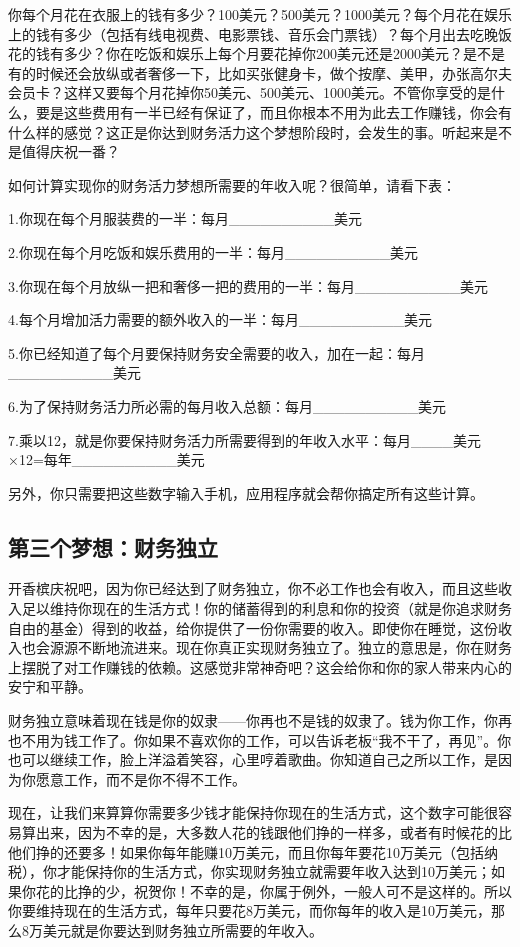 你每个月花在衣服上的钱有多少？100美元？500美元？1000美元？每个月花在娱乐上的钱有多少（包括有线电视费、电影票钱、音乐会门票钱）？每个月出去吃晚饭花的钱有多少？你在吃饭和娱乐上每个月要花掉你200美元还是2000美元？是不是有的时候还会放纵或者奢侈一下，比如买张健身卡，做个按摩、美甲，办张高尔夫会员卡？这样又要每个月花掉你50美元、500美元、1000美元。不管你享受的是什么，要是这些费用有一半已经有保证了，而且你根本不用为此去工作赚钱，你会有什么样的感觉？这正是你达到财务活力这个梦想阶段时，会发生的事。听起来是不是值得庆祝一番？

如何计算实现你的财务活力梦想所需要的年收入呢？很简单，请看下表：

1.你现在每个月服装费的一半：每月\_\_\_\_\_\_\_\_\_\_美元

2.你现在每个月吃饭和娱乐费用的一半：每月\_\_\_\_\_\_\_\_\_\_美元

3.你现在每个月放纵一把和奢侈一把的费用的一半：每月\_\_\_\_\_\_\_\_\_\_美元

4.每个月增加活力需要的额外收入的一半：每月\_\_\_\_\_\_\_\_\_\_美元

5.你已经知道了每个月要保持财务安全需要的收入，加在一起：每月\_\_\_\_\_\_\_\_\_\_美元

6.为了保持财务活力所必需的每月收入总额：每月\_\_\_\_\_\_\_\_\_\_美元

7.乘以12，就是你要保持财务活力所需要得到的年收入水平：每月\_\_\_\_美元×12=每年\_\_\_\_\_\_\_\_\_\_美元

另外，你只需要把这些数字输入手机，应用程序就会帮你搞定所有这些计算。

\subsection{第三个梦想：财务独立}

开香槟庆祝吧，因为你已经达到了财务独立，你不必工作也会有收入，而且这些收入足以维持你现在的生活方式！你的储蓄得到的利息和你的投资（就是你追求财务自由的基金）得到的收益，给你提供了一份你需要的收入。即使你在睡觉，这份收入也会源源不断地流进来。现在你真正实现财务独立了。独立的意思是，你在财务上摆脱了对工作赚钱的依赖。这感觉非常神奇吧？这会给你和你的家人带来内心的安宁和平静。

财务独立意味着现在钱是你的奴隶——你再也不是钱的奴隶了。钱为你工作，你再也不用为钱工作了。你如果不喜欢你的工作，可以告诉老板“我不干了，再见”。你也可以继续工作，脸上洋溢着笑容，心里哼着歌曲。你知道自己之所以工作，是因为你愿意工作，而不是你不得不工作。

现在，让我们来算算你需要多少钱才能保持你现在的生活方式，这个数字可能很容易算出来，因为不幸的是，大多数人花的钱跟他们挣的一样多，或者有时候花的比他们挣的还要多！如果你每年能赚10万美元，而且你每年要花10万美元（包括纳税），你才能保持你的生活方式，你实现财务独立就需要年收入达到10万美元；如果你花的比挣的少，祝贺你！不幸的是，你属于例外，一般人可不是这样的。所以你要维持现在的生活方式，每年只要花8万美元，而你每年的收入是10万美元，那么8万美元就是你要达到财务独立所需要的年收入。

